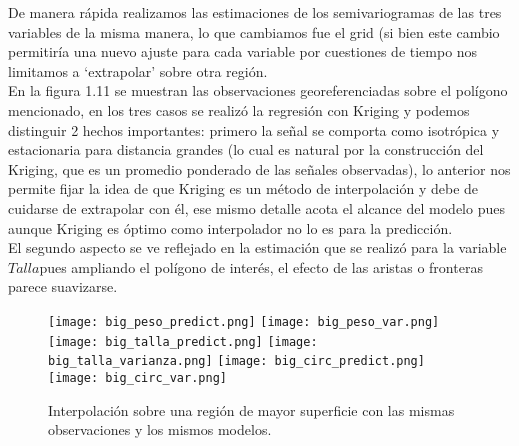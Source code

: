 \documentclass[paper=letter, fontsize=11pt]{scrartcl}
\numberwithin{equation}{section} %
\numberwithin{figure}{section} %
\numberwithin{table}{section} %
\begin{document}
De manera rápida realizamos las estimaciones de los semivariogramas de las tres variables de la misma manera, lo que cambiamos fue el grid (si bien este cambio permitiría una nuevo ajuste para cada variable por cuestiones de tiempo nos limitamos a ‘extrapolar’ sobre otra región.\\
En la figura 1.11 se muestran las observaciones georeferenciadas sobre el polígono mencionado, en los tres casos se realizó la regresión con Kriging y podemos distinguir 2 hechos importantes: primero la señal se comporta como isotrópica y estacionaria para distancia grandes (lo cual es natural por la construcción del Kriging, que es un promedio ponderado de las señales observadas), lo anterior nos permite fijar la idea de que Kriging es un método de interpolación y debe de cuidarse de extrapolar con él, ese mismo detalle acota el alcance del modelo pues aunque Kriging es óptimo como interpolador no lo es para la predicción.\\
El segundo aspecto se ve reflejado en la estimación que se realizó para la variable $Talla$pues ampliando el polígono de interés, el efecto de las aristas o fronteras parece suavizarse. 




\begin{figure}[htbp]
\texttt{[image: big\_peso\_predict.png]}
\texttt{[image: big\_peso\_var.png]}
\texttt{[image: big\_talla\_predict.png]}
\texttt{[image: big\_talla\_varianza.png]}
\texttt{[image: big\_circ\_predict.png]}
\texttt{[image: big\_circ\_var.png]}

\caption{Interpolación sobre una región de mayor superficie con las mismas observaciones y los mismos modelos.}
\label{img1}
\end{figure}


  

\end{document}
